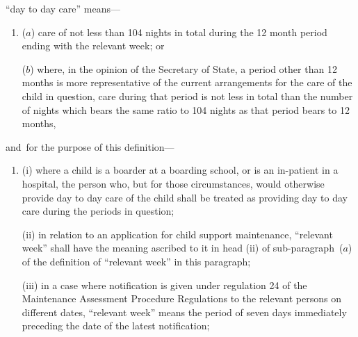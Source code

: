 \documentclass[12pt,a4paper]{article}
\begin{document}
\begin{enumerate}
“day to day care” means—
\begin{enumerate}\item[]
($a$) care of not less than 104 nights in total during the 12 month period ending with the relevant week; or

($b$) where, in the opinion of the 
Secretary of State, a period other than 12 months  %
is more representative of the current arrangements for the care of the child in question, care during that period is not less in total than the number of nights which bears the same ratio to 104 nights as that period bears to 12 months,
\end{enumerate}
and~for the purpose of this definition—
\begin{enumerate}\item[]
(i) where a child is a boarder at a boarding school, or is an in-patient in a hospital, the person who, but for those circumstances, would otherwise provide day to day care of the child shall be treated as providing day to day care during the periods in question;


(ii) in relation to an application for child support maintenance, “relevant week” shall have the meaning ascribed to it in head (ii) of sub-paragraph~($a$) of the definition of “relevant week” in this paragraph;

%

(iii) in a case where notification is given under regulation 24 of the Maintenance Assessment Procedure Regulations to the relevant persons on different dates, “relevant week” means the period of seven days immediately preceding the date of the latest notification;
\end{enumerate}


\end{enumerate}
\end{document}
